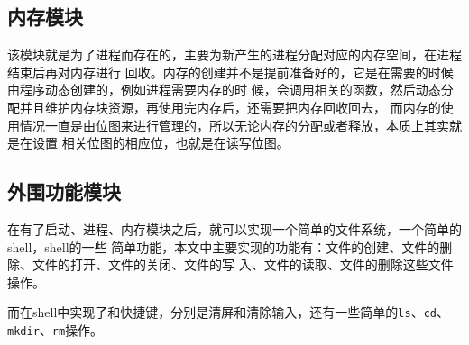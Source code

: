 \subsection{内存模块}

该模块就是为了进程而存在的，主要为新产生的进程分配对应的内存空间，在进程结束后再对内存进行
回收。内存的创建并不是提前准备好的，它是在需要的时候由程序动态创建的，例如进程需要内存的时
候，会调用相关的函数，然后动态分配并且维护内存块资源，再使用完内存后，还需要把内存回收回去，
而内存的使用情况一直是由位图来进行管理的，所以无论内存的分配或者释放，本质上其实就是在设置
相关位图的相应位，也就是在读写位图。

\subsection{外围功能模块}

在有了启动、进程、内存模块之后，就可以实现一个简单的文件系统，一个简单的shell，shell的一些
简单功能，本文中主要实现的功能有：文件的创建、文件的删除、文件的打开、文件的关闭、文件的写
入、文件的读取、文件的删除这些文件操作。

而在shell中实现了和快捷键，分别是清屏和清除输入，还有一些简单的\texttt{ls}、\texttt{cd}、
\texttt{mkdir}、\texttt{rm}操作。 

